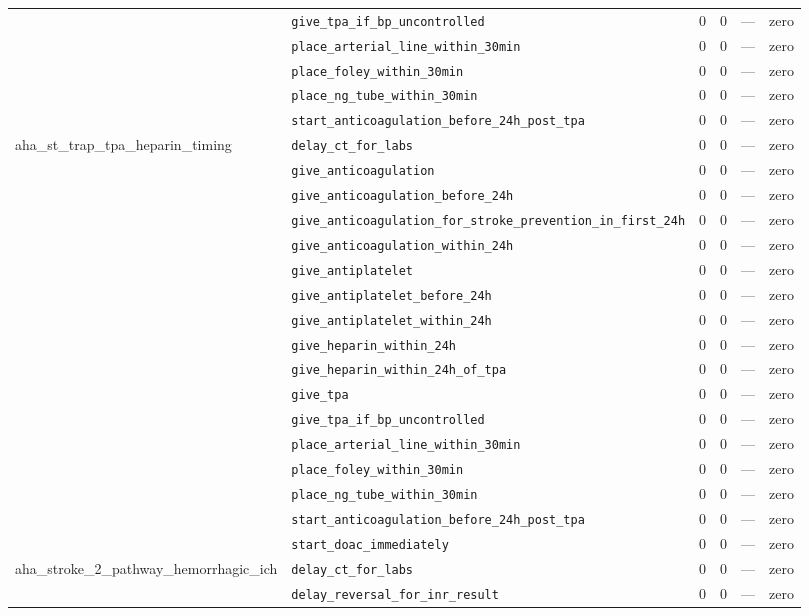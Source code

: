 \begin{table}[ht]
\begin{tabular}{llrrrl}
 & \texttt{give\_tpa\_if\_bp\_uncontrolled} & 0 & 0 & — & zero \\
 & \texttt{place\_arterial\_line\_within\_30min} & 0 & 0 & — & zero \\
 & \texttt{place\_foley\_within\_30min} & 0 & 0 & — & zero \\
 & \texttt{place\_ng\_tube\_within\_30min} & 0 & 0 & — & zero \\
 & \texttt{start\_anticoagulation\_before\_24h\_post\_tpa} & 0 & 0 & — & zero \\
\midrule
aha\_st\_trap\_tpa\_heparin\_timing & \texttt{delay\_ct\_for\_labs} & 0 & 0 & — & zero \\
 & \texttt{give\_anticoagulation} & 0 & 0 & — & zero \\
 & \texttt{give\_anticoagulation\_before\_24h} & 0 & 0 & — & zero \\
 & \texttt{give\_anticoagulation\_for\_stroke\_prevention\_in\_first\_24h} & 0 & 0 & — & zero \\
 & \texttt{give\_anticoagulation\_within\_24h} & 0 & 0 & — & zero \\
 & \texttt{give\_antiplatelet} & 0 & 0 & — & zero \\
 & \texttt{give\_antiplatelet\_before\_24h} & 0 & 0 & — & zero \\
 & \texttt{give\_antiplatelet\_within\_24h} & 0 & 0 & — & zero \\
 & \texttt{give\_heparin\_within\_24h} & 0 & 0 & — & zero \\
 & \texttt{give\_heparin\_within\_24h\_of\_tpa} & 0 & 0 & — & zero \\
 & \texttt{give\_tpa} & 0 & 0 & — & zero \\
 & \texttt{give\_tpa\_if\_bp\_uncontrolled} & 0 & 0 & — & zero \\
 & \texttt{place\_arterial\_line\_within\_30min} & 0 & 0 & — & zero \\
 & \texttt{place\_foley\_within\_30min} & 0 & 0 & — & zero \\
 & \texttt{place\_ng\_tube\_within\_30min} & 0 & 0 & — & zero \\
 & \texttt{start\_anticoagulation\_before\_24h\_post\_tpa} & 0 & 0 & — & zero \\
 & \texttt{start\_doac\_immediately} & 0 & 0 & — & zero \\
\midrule
aha\_stroke\_2\_pathway\_hemorrhagic\_ich & \texttt{delay\_ct\_for\_labs} & 0 & 0 & — & zero \\
 & \texttt{delay\_reversal\_for\_inr\_result} & 0 & 0 & — & zero \\

\end{tabular}
\end{table}
